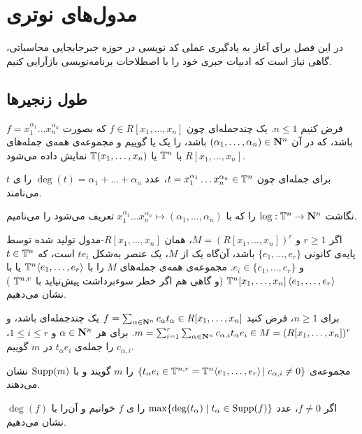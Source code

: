 
\chapter{مدول‌های نوتری}
در این فصل برای آغاز به یادگیری عملی کد نویسی در حوزه جبرجابجایی محاسباتی، گاهی نیاز است که ادبیات جبری خود را با اصطلاحات برنامه‌نویسی بازآرایی کنیم.
\section{طول زنجیر‌ها}
فرض کنیم
$n\le 1$.
یک چندجمله‌ای چون
$f\in R[x_1,\dots,x_n]$
که بصورت
$f=x_1^{\alpha_1}\dots x_n^{\alpha_n}$
باشد، که در آن 
$(\alpha_1,\dots,\alpha_n)\in{\bf N}^n$
باشد، را یک  یا  گوییم و مجموعه‌ی همه‌ی جمله‌های 
$R[x_1,\dots,x_n]$
با
${\Bbb T}^n$ 
یا
${\Bbb T}(x_1,\dots,x_n)$
نمایش داده می‌شود.

برای جمله‌ای چون
$t=x_1^{\alpha_1}\dots x_n^{\alpha_n}\in{\Bbb T}^n$،
عدد
$\deg(t)=\alpha_1+\dots+\alpha_n$
را ی $t$ می‌نامند.

نگاشت
$\log:{\Bbb T}^n\to{\bf N}^n$
را که با 
$x_1^{\alpha_1}\dots x_n^{\alpha_n}\mapsto(\alpha_1,\dots,\alpha_n)$
تعریف می‌شود را  می‌نامیم.

اگر
$r\ge 1$
و
$M=(R[x_1,\dots,x_n])^r$،
همان $R[x_1,\dots,x_n]$-مدول تولید شده توسط پایه‌ی کانونی
$\{e_1,\dots,e_r\}$
باشد، آن‌گاه یک   از $M$، یک عنصر به‌شکل
$te_i$
است، که 
$t\in{\Bbb T}^n$
و
$e_i\in\{e_1,\dots,e_r\}$.
مجموعه‌ی همه‌ی جمله‌های $M$ را با
${\Bbb T}^n\!\left<e_1,\dots,e_r\right>$
یا با
${\Bbb T}^n[x_1,\dots,x_n]\left<e_1,\dots,e_r\right>$
(و گاهی هم اگر خطر سوءبرداشت پیش‌نیاید با
${\Bbb T}^{n,r}$
)
نشان می‌دهیم.

برای $n\ge1$، فرض کنید 
$f=\sum_{\alpha\in{\bf N}^n}c_\alpha t_\alpha\in R[x_1,\dots,x_n]$
یک چندجمله‌ای باشد، و
$m=\sum_{i=1}^r\sum_{\alpha\in{\bf N}^n}c_{\alpha,i} t_\alpha e_i\in M=(R[x_1,\dots,x_n])^r$.
برای هر
$\alpha\in{\bf N}^n$
و 
$1\le i\le r$،
$c_{\alpha,i}$
را  جمله‌ی $t_\alpha e_i$ در $m$ گوییم.

مجموعه‌ی
$\{t_\alpha e_i\in {\Bbb T}^{n,r}={\Bbb T}^n\!\left<e_1,\dots,e_r\right>|\; c_{\alpha,i}\ne 0\}$
را  $m$ گویند و با
$\operatorname{Supp}(m)$
نشان می‌دهند.

اگر 
$f\ne 0$،
عدد 
$\max\{\deg(t_\alpha)\;|\;t_\alpha\in\operatorname{Supp}(f)\}$
را ی $f$ خوانیم و آن‌را با
$\deg(f)$
نشان می‌دهیم.
